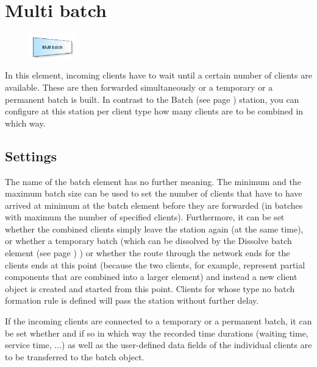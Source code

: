 \section{Multi batch}
\label{ref:ModelElementBatchMulti}

\begin{figure}
\vspace{-22pt}
\includegraphics[width=2cm]{imageModelElementBatchMulti.png}
\vspace{-22pt}
\end{figure}

In this element, incoming clients have to wait until a certain number of clients are available.
These are then forwarded simultaneously or a temporary or a permanent batch is built.
In contrast to the Batch (see page \pageref{ref:ModelElementBatch}) station, you can configure
at this station per client type how many clients are to be combined in which way.

\subsection*{Settings}

The name of the batch element has no further meaning. The minimum and the maximum batch size can be used
to set the number of clients that have to have arrived at minimum at the batch element before they are
forwarded (in batches with maximum the number of specified clients). Furthermore, it can be set whether
the combined clients simply leave the station again (at the same time), or whether a temporary batch (which
can be dissolved by the Dissolve batch element (see page \pageref{ref:ModelElementSeparate}) ) or whether the route
through the network ends for the clients ends at this point (because the two clients, for example, represent
partial components that are combined into a larger element) and instead a new client object is created and
started from this point.
Clients for whose type no batch formation rule is defined will pass the station without further delay.

If the incoming clients are connected to a temporary or a permanent batch, it can be set whether and if so
in which way the recorded time durations (waiting time, service time, ...) as well as the user-defined
data fields of the individual clients are to be transferred to the batch object.

